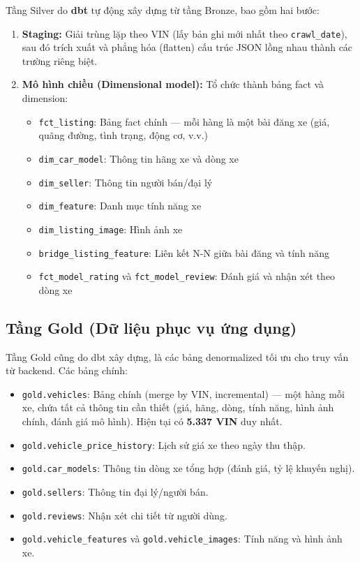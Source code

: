 Tầng Silver do \textbf{dbt} tự động xây dựng từ tầng Bronze, bao gồm hai bước:
\begin{enumerate}
    \item \textbf{Staging:} Giải trùng lặp theo VIN (lấy bản ghi mới nhất theo \texttt{crawl\_date}), sau đó trích xuất và phẳng hóa (flatten) cấu trúc JSON lồng nhau thành các trường riêng biệt.
    \item \textbf{Mô hình chiều (Dimensional model):} Tổ chức thành bảng fact và dimension:
    \begin{itemize}
        \item \texttt{fct\_listing}: Bảng fact chính — mỗi hàng là một bài đăng xe (giá, quãng đường, tình trạng, động cơ, v.v.)
        \item \texttt{dim\_car\_model}: Thông tin hãng xe và dòng xe
        \item \texttt{dim\_seller}: Thông tin người bán/đại lý
        \item \texttt{dim\_feature}: Danh mục tính năng xe
        \item \texttt{dim\_listing\_image}: Hình ảnh xe
        \item \texttt{bridge\_listing\_feature}: Liên kết N-N giữa bài đăng và tính năng
        \item \texttt{fct\_model\_rating} và \texttt{fct\_model\_review}: Đánh giá và nhận xét theo dòng xe
    \end{itemize}
\end{enumerate}

\subsection{Tầng Gold (Dữ liệu phục vụ ứng dụng)}

Tầng Gold cũng do dbt xây dựng, là các bảng denormalized tối ưu cho truy vấn từ backend. Các bảng chính:
\begin{itemize}
    \item \texttt{gold.vehicles}: Bảng chính (merge by VIN, incremental) — một hàng mỗi xe, chứa tất cả thông tin cần thiết (giá, hãng, dòng, tính năng, hình ảnh chính, đánh giá mô hình). Hiện tại có \textbf{5.337 VIN} duy nhất.
    \item \texttt{gold.vehicle\_price\_history}: Lịch sử giá xe theo ngày thu thập.
    \item \texttt{gold.car\_models}: Thông tin dòng xe tổng hợp (đánh giá, tỷ lệ khuyến nghị).
    \item \texttt{gold.sellers}: Thông tin đại lý/người bán.
    \item \texttt{gold.reviews}: Nhận xét chi tiết từ người dùng.
    \item \texttt{gold.vehicle\_features} và \texttt{gold.vehicle\_images}: Tính năng và hình ảnh xe.
\end{itemize}

